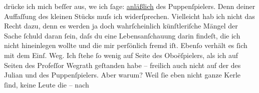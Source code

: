                drücke ich mich beſſer aus, we{\geminationn} ich ſage: \uline{anläßlich} des Puppenſpielers. Denn deiner Auffaſſung des kleinen Stücks muſs ich
               widerſprechen. Vielleicht hab ich nicht das Recht dazu, denn es werden ja doch
               wahrſcheinlich künſt{\pb}leriſche Mängel der Sache ſchuld daran ſein, daſs du eine Lebensanſchauung darin
               findeſt, die ich nicht hineinlegen wollte und die mir perſönlich fremd iſt. Ebenſo
               verhält es ſich mit dem Einſ. Weg. Ich ſtehe ſo
               wenig auf Seite des Oboëſpielers, als \introOben{}ich\introOben{} auf Seiten des Profeſſor Wegrath geſtanden
               habe – freilich auch nicht auf der des Julian und des Puppenſpielers. Aber warum?
               Weil ſie eben nicht ganze Kerle ſind, \introOben{}keine Leute\introOben{} die – nach
